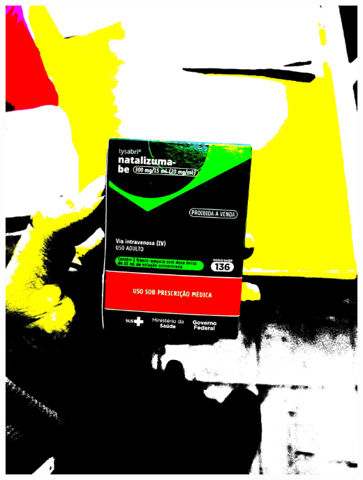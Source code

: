 \begin{frame}
\begin{columns}
\begin{column}{0.24\textwidth}
			\includegraphics[height=0.35\textheight]{../pictures/tysabri_rgb_thresh_recomposed_cmyk.jpg}
			\\\vspace{\floatsep}

\end{column}
\end{columns}
\end{frame}
